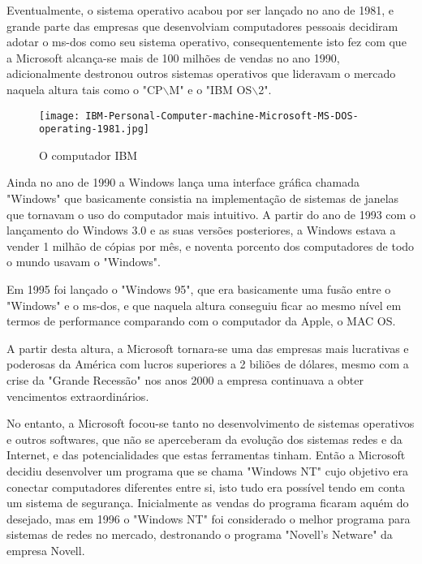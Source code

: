 \documentclass{report}
\begin{document}
\vspace{5mm}

Eventualmente, o sistema operativo acabou por ser lançado no ano de 1981, e grande parte das empresas que desenvolviam computadores pessoais decidiram adotar o \acs{ms-dos} como seu sistema operativo, consequentemente isto fez com que a Microsoft alcança-se mais de 100 milhões de vendas no ano 1990, adicionalmente destronou outros sistemas operativos que lideravam o mercado naquela altura tais como o "CP$\backslash$M" e o "IBM OS$\backslash$2".

\vspace{5mm}

\begin{figure}[h!]
\texttt{[image: IBM-Personal-Computer-machine-Microsoft-MS-DOS-operating-1981.jpg]}
\centering
\caption{O computador IBM}
\end{figure}

\vspace{5mm}

Ainda no ano de 1990 a Windows lança uma interface gráfica  chamada "Windows" que basicamente consistia na  implementação de sistemas de janelas que tornavam o uso do computador mais intuitivo. A partir do ano de 1993 com o lançamento do Windows 3.0 e as suas versões posteriores, a Windows estava a vender 1 milhão de cópias por mês, e noventa porcento dos computadores de todo o mundo usavam o "Windows".

Em 1995 foi lançado o "Windows 95", que era basicamente uma fusão entre o "Windows" e o \acs{ms-dos}, e que naquela altura conseguiu ficar ao mesmo nível em termos de performance comparando com o computador da Apple, o MAC OS.

A partir desta altura, a Microsoft tornara-se uma das empresas mais lucrativas e poderosas da América com lucros superiores a 2 biliões de dólares, mesmo com a crise da "Grande Recessão" nos anos 2000 a empresa continuava a obter vencimentos extraordinários.

No entanto, a Microsoft focou-se tanto no desenvolvimento de sistemas operativos e outros softwares, que não se aperceberam da evolução dos sistemas redes e da Internet, e das potencialidades que estas ferramentas tinham. Então a Microsoft decidiu desenvolver um programa que se chama "Windows NT" cujo objetivo era conectar computadores diferentes entre si, isto tudo era possível tendo em conta um sistema de segurança. Inicialmente as vendas do programa ficaram aquém do desejado, mas em 1996 o "Windows NT" foi considerado o melhor programa para sistemas de redes no mercado, destronando o programa "Novell's Netware" da empresa Novell.
\end{document}
